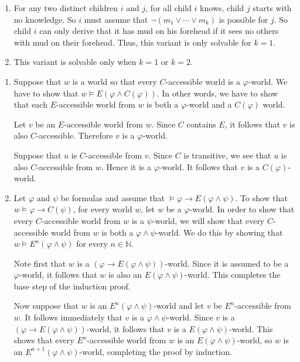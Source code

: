 \documentclass{article}
\begin{document}
\begin{ex}
\begin{enumerate}
\item For any two distinct children $i$ and $j$, for all child $i$ knows,
child $j$ starts with no knowledge. So $i$ must assume that 
$\neg(m_1\lor\cdots\lor m_k)$ is possible for $j$. So child $i$ can only
derive that it has mud on his forehead if it sees no others with mud on their
forehead. Thus, this variant is only solvable for $k=1$.
\item This variant is solvable only when $k=1$ or $k=2$. 
\end{enumerate}
\end{ex}

\begin{ex}
\begin{enumerate}
\item Suppose that $w$ is a world so that every $C$-accessible world is a
$\varphi$-world. We have to show that $w\models E(\varphi\land C(\varphi))$.
In other words, we have to show that each $E$-accessible world from $w$ is
both a $\varphi$-world and a $C(\varphi)$ world.

Let $v$ be an $E$-accessible world from $w$. 
Since $C$ contains $E$, it follows that $v$ is also 
$C$-accessible. Therefore $v$ is a $\varphi$-world.

Suppose that $u$ is $C$-accessible from $v$. Since $C$ is transitive, we see
that $u$ is also $C$-accessible from $w$. Hence it is a $\varphi$-world. It
follows that $v$ is a $C(\varphi)$-world.
\item Let $\varphi$ and $\psi$ be formulas and assume that
$\models \varphi\to E(\varphi\land\psi)$. To show that $w\models\varphi\to C(\psi)$,
for every world $w$, let $w$ be a $\varphi$-world. In order to show that every
$C$-accessible world from $w$ is a $\psi$-world, we will show that every $C$-accessible
world from $w$ is both a $\varphi\land\psi$-world. We do this by showing
that $w\models E^n(\varphi\land\psi)$ for every $n\in\mathbb{N}$.

Note first that $w$ is a $(\varphi\to E(\varphi\land\psi))$-world. Since it is
assumed to be a $\varphi$-world, it follows that $w$ is also an $E(\varphi\land
\psi)$-world. This completes the base step of the induction proof.

Now suppose that $w$ is an $E^n(\varphi\land\psi)$-world and let $v$ be
$E^n$-accessible from $w$. It follows immediately that $v$ is a
$\varphi\land\psi$-world. Since $v$ is a $(\varphi\to E(\varphi\land\psi))$-world,
it follows that $v$ is a $E(\varphi\land\psi)$-world. This shows that every
$E^n$-accessible world from $w$ is an $E(\varphi\land\psi)$-world, so $w$ is
an $E^{n+1}(\varphi\land\psi)$-world,
completing the proof by induction.

\end{enumerate}
\end{ex}
\end{document}
